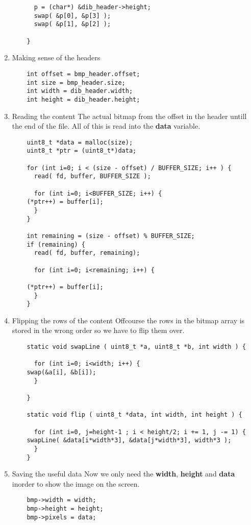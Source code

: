 \begin{enumerate}
\begin{lstlisting}
      p = (char*) &dib_header->height;
      swap( &p[0], &p[3] );
      swap( &p[1], &p[2] );

    }
  \end{lstlisting}

\item Making sense of the headers
  \begin{lstlisting}
    int offset = bmp_header.offset;
    int size = bmp_header.size;
    int width = dib_header.width;
    int height = dib_header.height;
  \end{lstlisting}
\item Reading the content \newline
  The actual bitmap from the offset in the header untill the end of the
  file. All of this is read into the {\bf data} variable.
  \begin{lstlisting}
    uint8_t *data = malloc(size);
    uint8_t *ptr = (uint8_t*)data;

    for (int i=0; i < (size - offset) / BUFFER_SIZE; i++ ) {
      read( fd, buffer, BUFFER_SIZE );

      for (int i=0; i<BUFFER_SIZE; i++) {
	(*ptr++) = buffer[i];
      }
    }

    int remaining = (size - offset) % BUFFER_SIZE;
    if (remaining) {
      read( fd, buffer, remaining);

      for (int i=0; i<remaining; i++) {

	(*ptr++) = buffer[i];
      }
    }
  \end{lstlisting}

\item Flipping the rows of the content \newline
  Offcourse the rows in the bitmap array is stored in the wrong order so
  we have to flip them over.
  \begin{lstlisting}
    static void swapLine ( uint8_t *a, uint8_t *b, int width ) {

      for (int i=0; i<width; i++) {
	swap(&a[i], &b[i]);
      }

    }

    static void flip ( uint8_t *data, int width, int height ) {

      for (int i=0, j=height-1 ; i < height/2; i += 1, j -= 1) {
	swapLine( &data[i*width*3], &data[j*width*3], width*3 );
      }
    }
  \end{lstlisting}
\item Saving the useful data\newline
  Now we only need the {\bf width}, {\bf height} and {\bf data} inorder
  to show the image on the screen.
  \begin{lstlisting}
    bmp->width = width;
    bmp->height = height;
    bmp->pixels = data;
  \end{lstlisting}
\end{enumerate}



